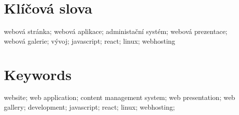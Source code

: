 \documentclass[12pt,a4paper]{report}
\begin{document}
  \section*{Klíčová slova}
  \noindent webová stránka; webová aplikace; administační systém; webová prezentace; webová galerie; vývoj; javascript; react; linux; webhosting
  
  \section*{Keywords}
  \noindent website; web application; content management system; web presentation; web gallery; development; javascript; react; linux; webhosting;  

  \clearpage
  
  \tableofcontents
 
  \clearpage
\end{document}
